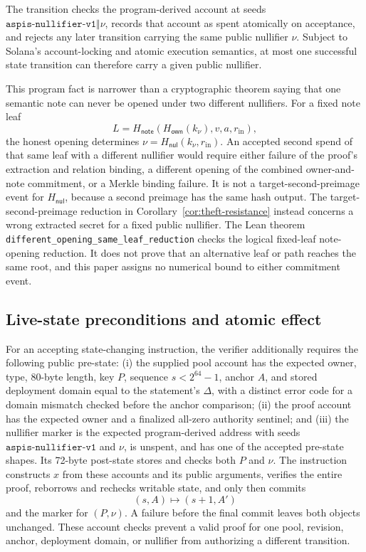 \begin{lemma}
\label{lem:no-double-spend}
The transition checks the program-derived account at seeds
\(\mathtt{aspis\mbox{-}nullifier\mbox{-}v1}\Vert\nu\), records that account as
spent atomically on acceptance, and rejects any later transition carrying the
same public nullifier \(\nu\).  Subject to Solana's account-locking and atomic
execution semantics, at most one successful state transition can therefore
carry a given public nullifier.

This program fact is narrower than a cryptographic theorem saying that one
semantic note can never be opened under two different nullifiers.  For a fixed
note leaf
\[
 L=H_{\mathsf{note}}(H_{\mathsf{own}}(k_\nu),v,a,r_{\mathrm{in}}),
\]
the honest opening determines
\(\nu=H_{\mathsf{nul}}(k_\nu,r_{\mathrm{in}})\).  An accepted second spend of
that same leaf with a different nullifier would require either failure of the
proof's extraction and relation binding, a different opening of the combined
owner-and-note commitment, or a Merkle binding failure.  It is not a
target-second-preimage event for \(H_{\mathsf{nul}}\), because a second
preimage has the same hash output.  The target-second-preimage reduction in
Corollary~\ref{cor:theft-resistance} instead concerns a wrong extracted secret
for a fixed public nullifier.  The Lean theorem
\texttt{different\_opening\_same\_leaf\_reduction} checks the logical
fixed-leaf note-opening reduction.  It does not prove that an alternative leaf
or path reaches the same root, and this paper assigns no numerical bound to
either commitment event.
\end{lemma}

\subsection{Live-state preconditions and atomic effect}

For an accepting state-changing instruction, the verifier additionally
requires the following public pre-state: (i) the supplied pool account has
the expected owner, type, 80-byte length, key \(P\), sequence
\(s<2^{64}-1\), anchor
\(A\), and stored deployment domain equal to the statement's \(\Delta\),
with a distinct error code for a domain mismatch checked before the anchor
comparison; (ii) the proof account has the expected owner and a finalized
  all-zero authority sentinel; and (iii) the nullifier marker is the expected
  program-derived address with seeds
\(\mathtt{aspis\mbox{-}nullifier\mbox{-}v1}\) and \(\nu\), is unspent, and
has one of the accepted pre-state shapes.  Its 72-byte post-state stores and
checks both \(P\) and \(\nu\).  The instruction
constructs \(x\) from these accounts and its public arguments, verifies the
entire proof, reborrows and rechecks writable state, and only then commits
\[
   (s,A)\longmapsto(s+1,A')
\]
and the marker for \((P,\nu)\).  A failure before the final commit leaves both
objects unchanged.  These account checks prevent a valid proof for one pool,
revision, anchor, deployment domain, or nullifier from authorizing a
different transition.

